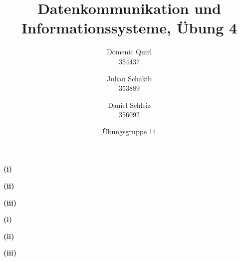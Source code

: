 \documentclass{../exercisesheet}
\title{Datenkommunikation und Informationssysteme, Übung 4}
\author{
    Domenic Quirl \\ 354437
    \and
    Julian Schakib \\ 353889
    \and 
    Daniel Schleiz \\ 356092
}
\date{Übungsgruppe 14}
\begin{document}
\maketitle
\pointtable


\begin{exercise}{4}
\begin{subexercise}

\end{subexercise}
\begin{subexercise}

\end{subexercise}
\begin{subexercise}

\end{subexercise}
\end{exercise}


\begin{exercise}{5}
\begin{subexercise}
\textbf{(i)}
\begin{adjustwidth}{2em}{0em}\vspace{-\baselineskip}

\end{adjustwidth}
\textbf{(ii)}
\begin{adjustwidth}{2em}{0em}\vspace{-\baselineskip}

\end{adjustwidth}
\textbf{(iii)}
\begin{adjustwidth}{2em}{0em}\vspace{-\baselineskip}

\end{adjustwidth}
\end{subexercise}
\begin{subexercise}
\textbf{(i)}
\begin{adjustwidth}{2em}{0em}\vspace{-\baselineskip}

\end{adjustwidth}
\textbf{(ii)}
\begin{adjustwidth}{2em}{0em}\vspace{-\baselineskip}

\end{adjustwidth}
\textbf{(iii)}
\begin{adjustwidth}{2em}{0em}\vspace{-\baselineskip}

\end{adjustwidth}
\end{subexercise}
\end{exercise}
\end{document}
